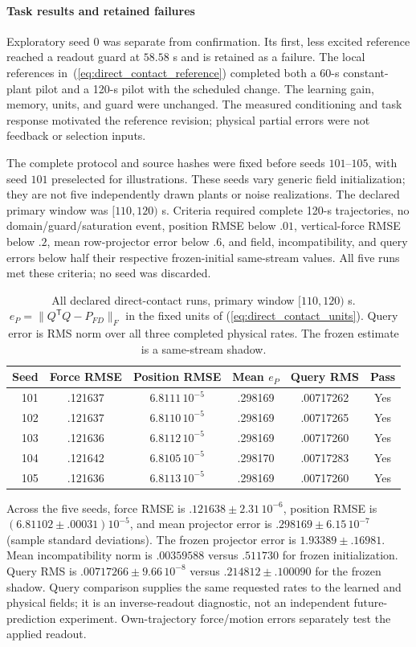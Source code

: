 \paragraph{Task results and retained failures}
Exploratory seed $0$ was separate from confirmation. Its first, less excited
reference reached a readout guard at $58.58$ s and is retained as a failure.
The local references in~(\ref{eq:direct_contact_reference}) completed both a
60-s constant-plant pilot and a 120-s pilot with the scheduled change.
The learning gain, memory, units, and guard were unchanged. The measured
conditioning and task response motivated the reference revision; physical
partial errors were not feedback or selection inputs.

The complete protocol and source hashes were fixed before seeds
$101$--$105$, with seed $101$ preselected for illustrations. These seeds vary
generic field initialization; they are not five independently drawn plants or
noise realizations. The declared primary window was $[110,120)$ s. Criteria
required complete 120-s trajectories, no domain/guard/saturation event,
position RMSE below $.01$, vertical-force RMSE below $.2$, mean row-projector
error below $.6$, and field, incompatibility, and query errors below half their
respective frozen-initial same-stream values. All five runs met these
criteria; no seed was discarded.

\begin{table}[t]
\centering\small\setlength{\tabcolsep}{2.5pt}
\caption{All declared direct-contact runs, primary window $[110,120)$ s.
$e_P=\|Q^{\mathsf T}Q-P_{FD}\|_F$ in the fixed units of
(\ref{eq:direct_contact_units}). Query error is RMS norm over all three
completed physical rates. The frozen estimate is a same-stream shadow.}
\label{tab:direct_contact_seeds}
\begin{tabular}{rccccc}
\hline
Seed & Force RMSE & Position RMSE & Mean $e_P$ & Query RMS & Pass\\
\hline
101 & .121637 & $6.8111\,10^{-5}$ & .298169 & .00717262 & Yes\\
102 & .121637 & $6.8110\,10^{-5}$ & .298169 & .00717265 & Yes\\
103 & .121636 & $6.8112\,10^{-5}$ & .298169 & .00717260 & Yes\\
104 & .121642 & $6.8105\,10^{-5}$ & .298170 & .00717283 & Yes\\
105 & .121636 & $6.8113\,10^{-5}$ & .298169 & .00717260 & Yes\\
\hline
\end{tabular}
\end{table}
Across the five seeds, force RMSE is $.121638\pm2.31\,10^{-6}$,
position RMSE is $(6.81102\pm.00031)10^{-5}$, and mean projector error is
$.298169\pm6.15\,10^{-7}$ (sample standard deviations). The frozen projector
error is $1.93389\pm.16981$. Mean incompatibility norm is $.00359588$ versus
$.511730$ for frozen initialization. Query RMS is $.00717266\pm9.66\,10^{-8}$
versus $.214812\pm.100090$ for the frozen shadow. Query comparison supplies
the same requested rates to the learned and physical fields; it is an
inverse-readout diagnostic, not an independent future-prediction experiment.
Own-trajectory force/motion errors separately test the applied readout.

